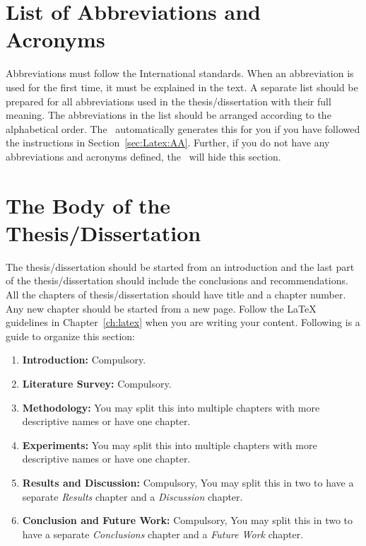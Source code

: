 \documentclass[12pt]{uomthesis}
\begin{document}
\section{List of Abbreviations and Acronyms}
Abbreviations must follow the International standards. When an abbreviation is used for the first time, it must be explained in the text. A separate list should be prepared for all abbreviations used in the thesis/dissertation with their full meaning. The abbreviations in the list should be arranged according to the alphabetical order. The~\TheClass{} automatically generates this for you if you have followed the instructions in Section~\ref{sec:Latex:AA}. Further, if you do not have any abbreviations and acronyms defined, the~\TheClass{} will hide this section.

\section{The Body of the Thesis/Dissertation}
The thesis/dissertation should be started from an introduction and the last part of the thesis/dissertation should include the conclusions and recommendations. All the chapters of thesis/dissertation should have title and a chapter number. Any new chapter should be started from a new page. Follow the \LaTeX{} guidelines in Chapter~\ref{ch:latex} when you are writing your content. Following is a guide to organize this section:

\begin{enumerate}
    \item\textbf{Introduction:} Compulsory.
    \item \textbf{Literature Survey:} Compulsory.
    \item \textbf{Methodology:} You may split this into multiple chapters with more descriptive names or have one chapter. 
    \item \textbf{Experiments:} You may split this into multiple chapters with more descriptive names or have one chapter. 
    \item \textbf{Results and Discussion:} Compulsory, You may split this in two to have a separate \textit{Results} chapter and a \textit{Discussion} chapter.
    \item \textbf{Conclusion and Future Work:} Compulsory, You may split this in two to have a separate \textit{Conclusions} chapter and a \textit{Future Work} chapter.
\end{enumerate}
\end{document}
